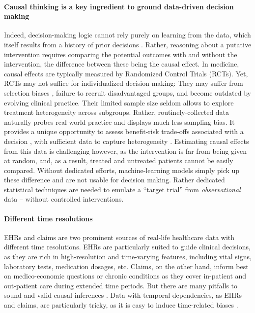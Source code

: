 \documentclass[french,12pt,twoside,a4paper]{book}
\begin{document}
\paragraph{Causal thinking is a key ingredient to ground data-driven decision
  making} \citep{prosperi2020causal} Indeed, decision-making logic cannot rely
purely on learning from the data, which itself results from a history of prior
decisions \citep{plecko2022causal}. Rather, reasoning about a putative
intervention requires comparing the potential outcomes with and without the
intervention, the difference between these being the causal effect.
In medicine, causal effects
are typically measured by Randomized Control Trials
(RCTs).
Yet, RCTs may not suffice for individualized decision making: They
may suffer from selection biases \citep{travers2007external,
  averitt2020translating}, failure to recruit disadvantaged groups, and
become outdated by evolving clinical practice. Their limited sample size
seldom allows to explore treatment heterogeneity across subgroups.
%
Rather, routinely-collected data naturally probes real-world practice and
displays much less sampling bias. It provides a unique opportunity to assess benefit-risk
trade-offs associated with a decision \citep{desai2021broadening}, with
sufficient data to capture heterogeneity \citep{rekkas2023standardized}.
Estimating causal effects from this data is challenging however,
as the intervention is far from being given at random, and,
as a result, treated and untreated patients cannot be easily compared. Without
dedicated efforts, machine-learning models simply pick up these difference and
are not usable for decision making. Rather dedicated statistical
techniques are needed to emulate a ``target trial'' from \emph{observational} data
-- without controlled interventions.

\paragraph{Different time resolutions} EHRs and claims are two prominent sources
of real-life healthcare data with different time resolutions. EHRs are
particularly suited to guide clinical decisions, as they are rich in
high-resolution and time-varying features, including vital signs, laboratory
tests, medication dosages, etc. Claims, on the other hand, inform best on
medico-economic questions or chronic conditions as they cover in-patient and
out-patient care during extended time periods.
%
But there are many pitfalls to sound and valid
causal inferences \citep{hernan2019second, schneeweiss2021conducting}.
%
Data with temporal dependencies, as EHRs and claims, are particularly
tricky, as it is easy to induce time-related biases
\citep{suissa2008immortal,wang2023emulation}.
\end{document}
